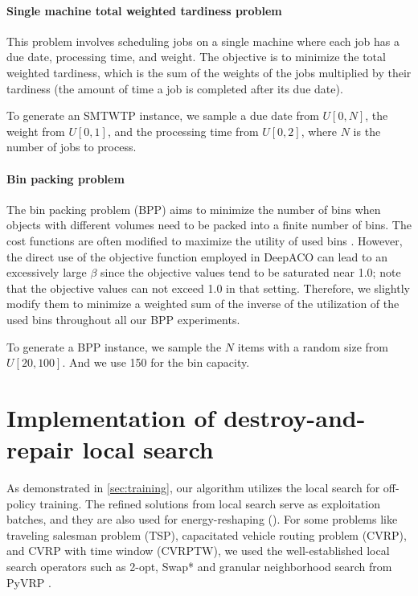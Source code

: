 \documentclass[twoside]{article}
\theoremstyle{plain}
\theoremstyle{definition}
\theoremstyle{remark}
\begin{document}
\paragraph{Single machine total weighted tardiness problem}
This problem involves scheduling jobs on a single machine where each job has a due date, processing time, and weight. The objective is to minimize the total weighted tardiness, which is the sum of the weights of the jobs multiplied by their tardiness (the amount of time a job is completed after its due date).

To generate an SMTWTP instance, we sample a due date from $U[0, N]$, the weight from $U[0, 1]$, and the processing time from $U[0, 2]$, where $N$ is the number of jobs to process.

\paragraph{Bin packing problem}
The bin packing problem (BPP) aims to minimize the number of bins when objects with different volumes need to be packed into a finite number of bins. The cost functions are often modified to maximize the utility of used bins \citep{falkenauer1992bpp, ye2023deepaco}.
However, the direct use of the objective function employed in DeepACO can lead to an excessively large $\beta$ since the objective values tend to be saturated near 1.0; note that the objective values can not exceed 1.0 in that setting. Therefore, we slightly modify them to minimize a weighted sum of the inverse of the utilization of the used bins throughout all our BPP experiments.


To generate a BPP instance, we sample the $N$ items with a random size from $U[20, 100]$. And we use 150 for the bin capacity.

\section{Implementation of destroy-and-repair local search}\label{append:destroy-and-repair}

As demonstrated in \cref{sec:training}, our algorithm utilizes the local search for off-policy training. The refined solutions from local search serve as exploitation batches, and they are also used for energy-reshaping ().
 For some problems like traveling salesman problem (TSP), capacitated vehicle routing problem (CVRP), and CVRP with time window (CVRPTW), we used the well-established local search operators such as 2-opt, Swap* \citep{vidal2022hybrid} and granular neighborhood search from PyVRP \citep{Wouda_Lan_Kool_PyVRP_2024}.
\end{document}
